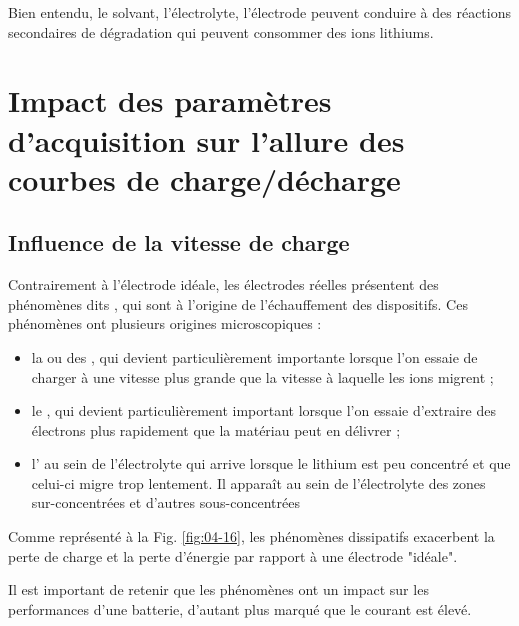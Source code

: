 Bien entendu, le solvant, l'électrolyte, l'électrode peuvent conduire à des réactions secondaires de dégradation qui peuvent consommer des ions lithiums.

\section{Impact des paramètres d'acquisition sur l'allure des courbes de charge/décharge}

\subsection{Influence de la vitesse de charge}

Contrairement à l'électrode idéale, les électrodes réelles présentent des phénomènes dits , qui sont à l'origine de l'échauffement des dispositifs. Ces phénomènes ont plusieurs origines microscopiques : 
\begin{itemize}
\item la  ou des , qui devient particulièrement importante lorsque l'on essaie de charger à une vitesse plus grande que la vitesse à laquelle les ions migrent ;
\item le , qui devient particulièrement important lorsque l'on essaie d'extraire des électrons plus rapidement que la matériau peut en délivrer ;
\item l' au sein de l'électrolyte qui arrive lorsque le lithium est peu concentré et que celui-ci migre trop lentement. Il apparaît au sein de l'électrolyte des zones sur-concentrées et d'autres sous-concentrées
\end{itemize}

Comme représenté à la Fig. \ref{fig:04-16}, les phénomènes dissipatifs exacerbent la perte de charge et la perte d'énergie par rapport à une électrode "idéale".

Il est important de retenir que les phénomènes  ont un impact sur les performances d'une batterie, d'autant plus marqué que le courant est élevé. 

